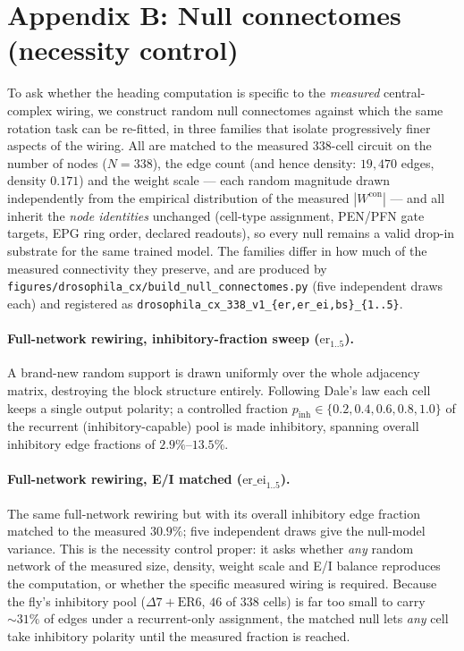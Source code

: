 \documentclass[11pt]{article}
\begin{document}
\clearpage

\section*{Appendix B: Null connectomes (necessity control)}
\label{app:er_null}

To ask whether the heading computation is specific to the \emph{measured}
central-complex wiring, we construct random null connectomes against which the
same rotation task can be re-fitted, in three families that isolate
progressively finer aspects of the wiring. All are matched to the measured
$338$-cell circuit on the number of nodes ($N=338$), the edge count (and hence
density: $19{,}470$ edges, density $0.171$) and the weight scale --- each random
magnitude drawn independently from the empirical distribution of the measured
$|W^{\mathrm{con}}|$ --- and all inherit the \emph{node identities} unchanged
(cell-type assignment, PEN/PFN gate targets, EPG ring order, declared readouts),
so every null remains a valid drop-in substrate for the same trained model. The
families differ in how much of the measured connectivity they preserve, and are
produced by \texttt{figures/drosophila\_cx/build\_null\_connectomes.py} (five
independent draws each) and registered as
\texttt{drosophila\_cx\_338\_v1\_\{er,er\_ei,bs\}\_\{1..5\}}.

\paragraph{Full-network rewiring, inhibitory-fraction sweep
($\mathrm{er}_{1..5}$).} A brand-new random support is drawn uniformly over the
whole adjacency matrix, destroying the block structure entirely. Following
Dale's law each cell keeps a single output polarity; a controlled fraction
$p_{\mathrm{inh}}\in\{0.2,0.4,0.6,0.8,1.0\}$ of the recurrent (inhibitory-capable)
pool is made inhibitory, spanning overall inhibitory edge fractions of
$2.9\%$--$13.5\%$.

\paragraph{Full-network rewiring, E/I matched ($\mathrm{er\_ei}_{1..5}$).} The
same full-network rewiring but with its overall inhibitory edge fraction matched
to the measured $30.9\%$; five independent draws give the null-model variance.
This is the necessity control proper: it asks whether \emph{any} random network
of the measured size, density, weight scale and E/I balance reproduces the
computation, or whether the specific measured wiring is required. Because the
fly's inhibitory pool ($\Delta 7 + \mathrm{ER6}$, $46$ of $338$ cells) is far
too small to carry $\sim31\%$ of edges under a recurrent-only assignment, the
matched null lets \emph{any} cell take inhibitory polarity until the measured
fraction is reached.
\end{document}
